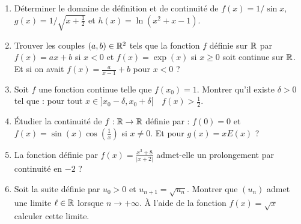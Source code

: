 \begin{frame}

\begin{miniexercice}
\begin{enumerate}
  \item Déterminer le domaine de définition et de continuité de
$f(x) = 1/\sin x$, $g(x) = 1/\sqrt{x+\frac12}$ et $h(x) = \ln(x^2+x-1)$.  
  
  \item Trouver les couples $(a,b)\in\mathbb{R}^2$ tels que la fonction $f$ définie sur $\mathbb{R}$ par 
  $f(x) = ax+b$ si $x< 0$ et $f(x) = \exp(x)$  si $x\geq 0$ soit continue sur $\mathbb{R}$. 
  Et si on avait $f(x) = \frac{a}{x-1}+b$ pour $x<0$ ?

  \item Soit $f$ une fonction continue telle que $f(x_0)=1$. Montrer qu'il existe $\delta>0$ tel que : 
  pour tout $x\in ]x_0 - \delta, x_0+\delta[ \quad f(x) > \frac12$.
  
  \item \'Etudier la continuité de $f : \mathbb{R} \to \mathbb{R}$ définie par : $f(0)=0$ et
  $f(x) = \sin(x)\cos\left(\frac1x\right)$ si $x\neq 0$.
  Et pour $g(x)=xE(x)$ ?

  \item La fonction définie par $f(x)=\frac{x^3+8}{|x+2|}$ admet-elle 
  un prolongement par continuité en $-2$ ?
  
  \item Soit la suite définie par $u_0>0$ et $u_{n+1}=\sqrt{u_n}$. Montrer que $(u_n)$ 
  admet une limite $\ell \in \mathbb{R}$ lorsque $n\to+\infty$. \`A l'aide de la fonction 
  $f(x)=\sqrt{x}$ calculer cette limite.
\end{enumerate}
\end{miniexercice}

\end{frame}

